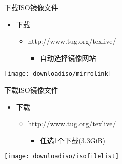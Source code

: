\documentclass[fontset = none, t]{ctexbeamer}
\begin{document}
\begin{frame}{下载\TeXLive}{ISO镜像文件}  
  \begin{itemize}
  \item 下载
    \begin{itemize}
    \item http://www.tug.org/texlive/
      \begin{itemize}
      \item 自动选择\alert{镜像网站}
      \end{itemize}
    \end{itemize}
  \end{itemize}
  \centering
  \begin{annotatedFigure}
    {\texttt{[image: downloadiso/mirrolink]}}
  \end{annotatedFigure}
\end{frame}

\begin{frame}{下载\TeXLive}{ISO镜像文件}  
  \begin{itemize}
  \item 下载
    \begin{itemize}
    \item http://www.tug.org/texlive/
      \begin{itemize}
      \item 任选1个下载(\alert{3.3GiB})
      \end{itemize}
    \end{itemize}    
  \end{itemize}
  \centering
  \begin{annotatedFigure}
    {\texttt{[image: downloadiso/isofilelist]}}
  \end{annotatedFigure}
\end{frame}
\end{document}
